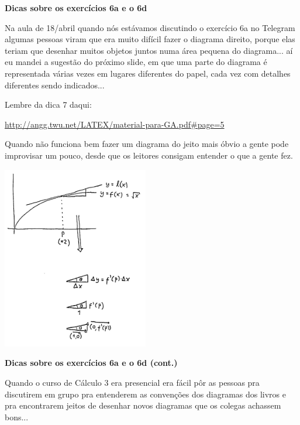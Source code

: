 \documentclass[oneside,12pt]{article}
\begin{document}
{\bf Dicas sobre os exercícios 6a e o 6d}

Na aula de 18/abril quando nós estávamos discutindo o exercício 6a no
Telegram algumas pessoas viram que era muito difícil fazer o diagrama
direito, porque elas teriam que desenhar muitos objetos juntos numa
área pequena do diagrama... aí eu mandei a sugestão do próximo slide,
em que uma parte do diagrama é representada várias vezes em lugares
diferentes do papel, cada vez com detalhes diferentes sendo
indicados...

Lembre da dica 7 daqui:


{\footnotesize

\url{http://angg.twu.net/LATEX/material-para-GA.pdf\#page=5}

}

\ssk

Quando não funciona bem fazer um diagrama do jeito mais óbvio a gente
pode improvisar um pouco, desde que os leitores consigam entender o
que a gente fez.



\newpage

\includegraphics[height=8cm]{2020-2-C3/20210428_C3_6a.pdf}


\newpage


{\bf Dicas sobre os exercícios 6a e o 6d (cont.)}

Quando o curso de Cálculo 3 era presencial era fácil pôr as pessoas
pra discutirem em grupo pra entenderem as convenções dos diagramas dos
livros e pra encontrarem jeitos de desenhar novos diagramas que os
colegas achassem bons...
\end{document}
